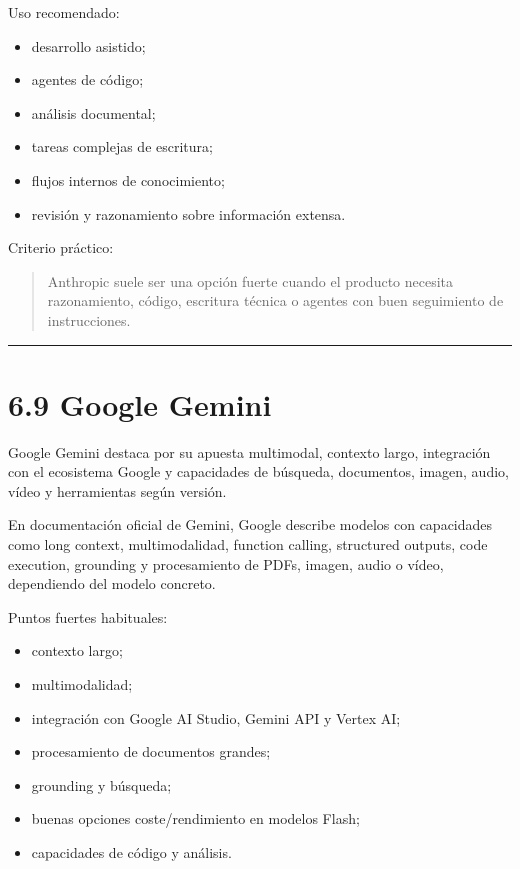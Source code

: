 Uso recomendado:

\begin{itemize}
\tightlist
\item
  desarrollo asistido;
\item
  agentes de código;
\item
  análisis documental;
\item
  tareas complejas de escritura;
\item
  flujos internos de conocimiento;
\item
  revisión y razonamiento sobre información extensa.
\end{itemize}

Criterio práctico:

\begin{quote}
Anthropic suele ser una opción fuerte cuando el producto necesita
razonamiento, código, escritura técnica o agentes con buen seguimiento
de instrucciones.
\end{quote}

\begin{center}\rule{0.5\linewidth}{0.5pt}\end{center}

\section{6.9 Google Gemini}\label{google-gemini}

Google Gemini destaca por su apuesta multimodal, contexto largo,
integración con el ecosistema Google y capacidades de búsqueda,
documentos, imagen, audio, vídeo y herramientas según versión.

En documentación oficial de Gemini, Google describe modelos con
capacidades como long context, multimodalidad, function calling,
structured outputs, code execution, grounding y procesamiento de PDFs,
imagen, audio o vídeo, dependiendo del modelo concreto.

Puntos fuertes habituales:

\begin{itemize}
\tightlist
\item
  contexto largo;
\item
  multimodalidad;
\item
  integración con Google AI Studio, Gemini API y Vertex AI;
\item
  procesamiento de documentos grandes;
\item
  grounding y búsqueda;
\item
  buenas opciones coste/rendimiento en modelos Flash;
\item
  capacidades de código y análisis.
\end{itemize}

